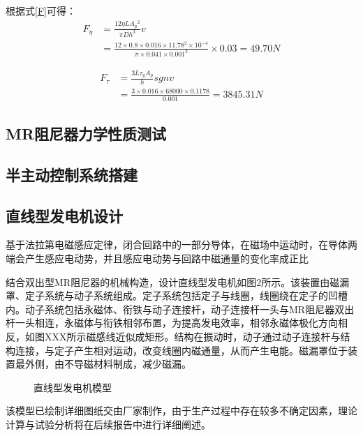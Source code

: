 根据式\eqref{F}可得：
\begin{equation}
\begin{split}
F_\eta&=\frac{12\eta LA{_p}{^2}}{\pi Dh^3}v\\&=\frac{12\times0.8\times0.016\times11.78^2\times10^{-4}}{\pi\times0.041\times0.001^3}\times0.03=49.70N
\end{split}
\end{equation}

\begin{equation}
\begin{split}
F_{\tau}&=\frac{3L\tau_yA_p}{h}sgnv\\&=\frac{3\times0.016\times68000\times0.1178}{0.001}=3845.31N
\end{split}
\end{equation}

\subsection{MR阻尼器力学性质测试}









\subsection{半主动控制系统搭建}






\subsection{直线型发电机设计}
基于法拉第电磁感应定律，闭合回路中的一部分导体，在磁场中运动时，在导体两端会产生感应电动势，并且感应电动势与回路中磁通量的变化率成正比\cite{elliott1993electromagnetics}

结合双出型MR阻尼器的机械构造，设计直线型发电机如图2所示。该装置由磁漏罩、定子系统与动子系统组成。定子系统包括定子与线圈，线圈绕在定子的凹槽内。动子系统包括永磁体、衔铁与动子连接杆，动子连接杆一头与MR阻尼器双出杆一头相连，永磁体与衔铁相邻布置，为提高发电效率，相邻永磁体极化方向相反，如图XXX所示磁感线近似成矩形。结构在振动时，动子通过动子连接杆与结构连接，与定子产生相对运动，改变线圈内磁通量，从而产生电能。磁漏罩位于装置最外侧，由不导磁材料制成，减少磁漏。

\begin{figure}[H]
\centering
\caption{直线型发电机模型}
\end{figure}
该模型已绘制详细图纸交由厂家制作，由于生产过程中存在较多不确定因素，理论计算与试验分析将在后续报告中进行详细阐述。